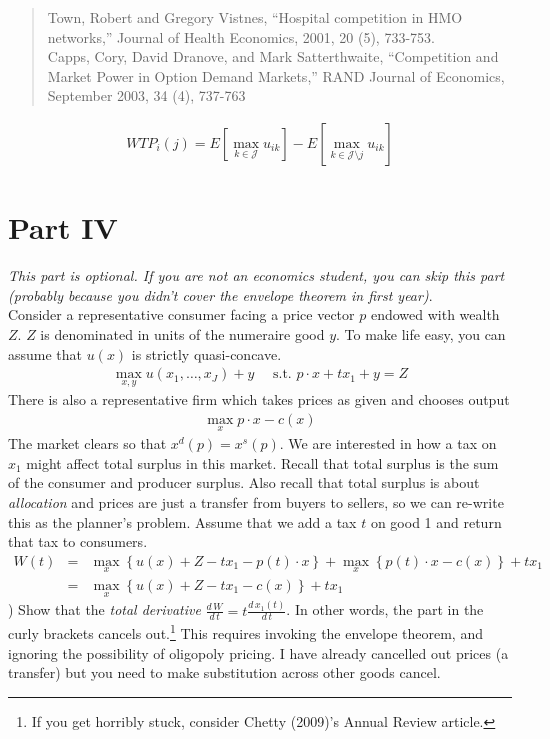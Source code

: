 \documentclass[12pt]{article}
\newcommand{\calJ}{\mathcal{J}}
\begin{document}
\begin{quote}
Town, Robert and Gregory Vistnes, ``Hospital competition in HMO networks,'' Journal of
Health Economics, 2001, 20 (5), 733-753.\\

Capps, Cory, David Dranove, and Mark Satterthwaite, ``Competition and Market Power in Option Demand Markets,''
RAND Journal of Economics, September 2003, 34 (4), 737-763
\end{quote}

\begin{align*}
WTP_i(j) = E[ \max_{k \in \calJ} u_{ik}] - E[ \max_{k \in \calJ \setminus j} u_{ik}]
\end{align*}


\section*{\normalsize Part IV}
\textit{This part is optional. If you are not an economics student, you can skip this part (probably because you didn't cover the envelope theorem in first year)}.\\



\noindent Consider a representative consumer facing a price vector $p$ endowed with wealth $Z$. $Z$ is denominated in units of the numeraire good $y$. To make life easy, you can assume that $u(x)$ is strictly quasi-concave.
\begin{eqnarray*}
\max_{x,y} u(x_1,\ldots,x_J) + y \quad \mbox{ s.t. } p \cdot x + t x_1 + y = Z
\end{eqnarray*}
There is also a representative firm which takes prices as given and chooses output
\begin{eqnarray*}
\max_x p \cdot x - c(x)
\end{eqnarray*}
The market clears so that $x^d(p) = x^s(p)$. We are interested in how a tax on $x_1$ might affect total surplus in this market. Recall that total surplus is the sum of the consumer and producer surplus. Also recall that total surplus is about \textit{allocation} and prices are just a transfer from buyers to sellers, so we can re-write this as the planner's problem. Assume that we add a tax $t$ on good 1 and return that tax to consumers.
\begin{eqnarray*}
W(t) &=& \max_x \left\{  u(x) + Z - t x_1 - p(t) \cdot x \right\}  + \max_x \left\{  p(t) \cdot x - c(x)\right\} + t x_1\\
&=& \max_x \left\{  u(x) + Z - t x_1  - c(x)\right\} + t x_1
\end{eqnarray*}
) Show that the \textit{total derivative} $\frac{d\, W}{d\, t} = t \frac{d\, x_1(t)}{d\, t}$. In other words, the part in the curly brackets cancels out.\footnote{If you get horribly stuck, consider Chetty (2009)'s Annual Review article.} This requires invoking the envelope theorem, and ignoring the possibility of oligopoly pricing. I have already cancelled out prices (a transfer) but you need to make substitution across other goods cancel.\\
\end{document}
